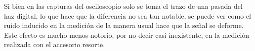 Si bien en las capturas del osciloscopio solo se toma el trazo de una pasada del haz digital, lo que hace que la diferencia no sea tan notable, se puede ver como el ruido inducido en la medici\'on de la manera usual hace que la se\~nal se deforme. Este efecto es mucho menos notorio, por no decir casi inexistente, en la medici\'on realizada con el accesorio resorte.  